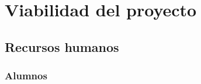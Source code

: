 %

\chapter{Viabilidad del proyecto}
\label{cap:proto-viabilidad}


\section{Recursos humanos}
\label{sec:proto-recursos-humanos}

\subsection{Alumnos}
\label{subsec:proto-recursos-alumnos}

